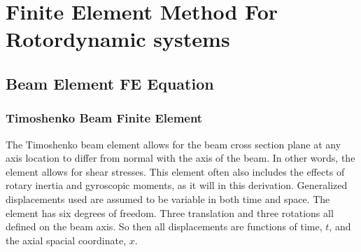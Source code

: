 \chapter{Finite Element Method For Rotordynamic systems}
\lipsum
\section{Beam Element FE Equation} \label{Beam Element FE Equation}
\subsection{Timoshenko Beam Finite Element} \label{Timoshenko Beam Finite Element}
The Timoshenko beam element allows for the beam cross section plane at any axis location to differ from normal with the axis of the beam. In other words, the element allows for shear stresses. This element often also includes the effects of rotary inertia and gyroscopic moments, as it will in this derivation. Generalized displacements used are assumed to be variable in both time and space. The element has six degrees of freedom. Three translation and three rotations all defined on the beam axis. So then all displacements are functions of time, $ t $, and the axial spacial coordinate, $ x $.
